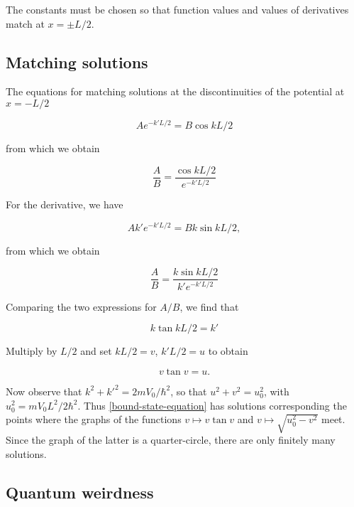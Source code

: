 The constants must be chosen so that function values and values of derivatives match at $x = \pm L/2$.

\subsection{Matching solutions}


The equations for matching solutions at the discontinuities of the potential at $x = -L/2$

\begin{equation}
Ae^{-k'L/2} = B\cos kL/2
\end{equation}

from which we obtain

\begin{equation}
\frac{A}{B} = \frac{\cos kL/2}{ e^{-k'L/2} }
\end{equation}

For the derivative, we have

\begin{equation}
Ak'e^{-k'L/2} = Bk\sin kL/2 ,
\end{equation}

from which we obtain

\begin{equation}
\frac{A}{B} = \frac{k\sin kL/2}{ k'e^{-k'L/2} }
\end{equation}

Comparing the two expressions for $A/B$, we find that

\begin{equation}
  k \tan kL/2 = k'
\end{equation}

Multiply by $L/2$ and set $kL/2  = v$, $k'L/2 = u$ to obtain

\begin{equation}
  v \tan v = u.
\end{equation}

Now observe that $k^2 + k'^2 = 2mV_0/\hbar^2$, so that $u^2 + v^2 = u_0^2$, with $u_0^2 = mV_0L^2/2\hbar^2$.  Thus
\eqref{bound-state-equation} has solutions corresponding the points where the graphs of the functions $v \mapsto v\tan v$ and $v \mapsto \sqrt{u_0^2 -v^2}$ meet.  Since the graph of the latter is a quarter-circle, there are only finitely many solutions.

\subsection{Quantum weirdness}


